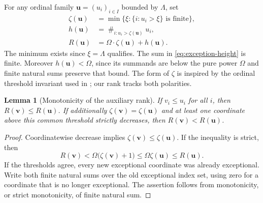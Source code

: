 \documentclass[11pt,letterpaper]{article}
\newtheorem{lemma}[theorem]{Lemma}
\theoremstyle{definition}
\theoremstyle{remark}
\newcommand{\bu}{\boldsymbol{u}}
\newcommand{\bv}{\boldsymbol{v}}
\newcommand{\natsum}{\mathop{\#}}
\begin{document}
For any ordinal family $\bu=(u_i)_{i\in I}$ bounded by $\Lambda$, set
\begin{align}
 \zeta(\bu)&=\min\{\xi:\{i:u_i>\xi\}\text{ is finite}\},\label{eq:zeta}\\
 h(\bu)&=\natsum_{i:u_i>\zeta(\bu)}u_i,\label{eq:exception-height}\\
 R(\bu)&=\Omega\cdot\zeta(\bu)+h(\bu).\label{eq:one-rank}
\end{align}
The minimum exists since $\xi=\Lambda$ qualifies. The sum in
\eqref{eq:exception-height} is finite. Moreover $h(\bu)<\Omega$, since its
summands are below the pure power $\Omega$ and finite natural sums preserve that
bound. The form of $\zeta$ is inspired by the ordinal threshold invariant used
in \cite{lipparini2026}; our rank tracks both polarities.

\begin{lemma}[Monotonicity of the auxiliary rank]\label{lem:rank-monotone}
If $v_i\leq u_i$ for all $i$, then $R(\bv)\leq R(\bu)$.
If additionally $\zeta(\bv)=\zeta(\bu)$ and at least one coordinate above this
common threshold strictly decreases, then $R(\bv)<R(\bu)$.
\end{lemma}
\begin{proof}
Coordinatewise decrease implies $\zeta(\bv)\leq\zeta(\bu)$. If the inequality is
strict, then
\[
 R(\bv)<\Omega\bigl(\zeta(\bv)+1\bigr)
 \leq\Omega\zeta(\bu)\leq R(\bu).
\]
If the thresholds agree, every new exceptional coordinate was already
exceptional. Write both finite natural sums over the old exceptional index set,
using zero for a coordinate that is no longer exceptional. The assertion follows
from monotonicity, or strict monotonicity, of finite natural sum.
\end{proof}
\end{document}
